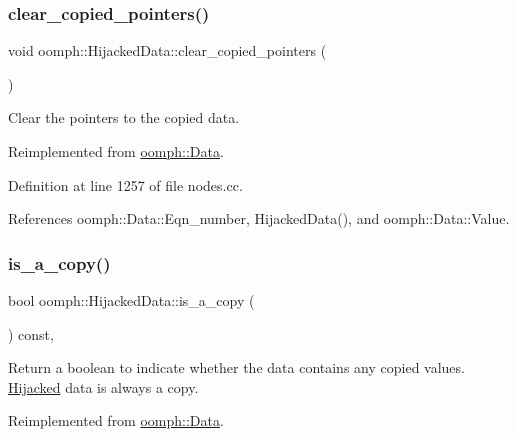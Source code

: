 \subsubsection{\texorpdfstring{clear\+\_\+copied\+\_\+pointers()}{clear\_copied\_pointers()}}
{\footnotesize\ttfamily void oomph\+::\+Hijacked\+Data\+::clear\+\_\+copied\+\_\+pointers (\begin{DoxyParamCaption}{ }\end{DoxyParamCaption})\hspace{0.3cm}{\ttfamily [virtual]}}



Clear the pointers to the copied data. 



Reimplemented from \hyperlink{classoomph_1_1Data_a409e3140829def2b1e738a24cc1f48bb}{oomph\+::\+Data}.



Definition at line 1257 of file nodes.\+cc.



References oomph\+::\+Data\+::\+Eqn\+\_\+number, Hijacked\+Data(), and oomph\+::\+Data\+::\+Value.

\mbox{\label{classoomph_1_1HijackedData_ad392e7561212e3196d05a35417697112}} 
\subsubsection{\texorpdfstring{is\+\_\+a\+\_\+copy()}{is\_a\_copy()}\hspace{0.1cm}{\footnotesize\ttfamily [1/2]}}
{\footnotesize\ttfamily bool oomph\+::\+Hijacked\+Data\+::is\+\_\+a\+\_\+copy (\begin{DoxyParamCaption}{ }\end{DoxyParamCaption}) const\hspace{0.3cm}{\ttfamily [inline]}, {\ttfamily [virtual]}}



Return a boolean to indicate whether the data contains any copied values. \hyperlink{classoomph_1_1Hijacked}{Hijacked} data is always a copy. 



Reimplemented from \hyperlink{classoomph_1_1Data_a736feee0f95ab3d542c70db6ca7ab233}{oomph\+::\+Data}.




